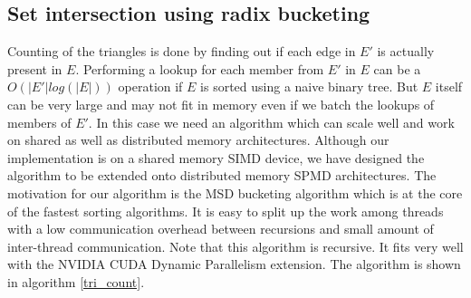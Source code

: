 \documentclass[conference]{IEEEtran}
\begin{document}






\subsection{Set intersection using radix bucketing}
Counting of the triangles is done by finding out if each edge in $E'$ is actually present in $E$. Performing a lookup for each member from $E'$ in $E$ can be a $O(|E'|log(|E|))$ operation if $E$ is sorted using a naive binary tree. But $E$ itself can be very large and may not fit in memory even if we batch the lookups of members of $E'$. In this case we need an algorithm which can scale well and work on shared as well as distributed memory architectures. Although our implementation is on a shared memory SIMD device, we have designed the algorithm to be extended onto distributed memory SPMD architectures. The motivation for our algorithm is the MSD bucketing algorithm which is at the core of the fastest sorting algorithms\cite{b14}. It is easy to split up the work among threads with a low communication overhead between recursions and small amount of inter-thread communication. Note that this algorithm is recursive. It fits very well with the NVIDIA CUDA Dynamic Parallelism extension\cite{b21}. The algorithm is shown in algorithm \ref{tri_count}.
\end{document}
